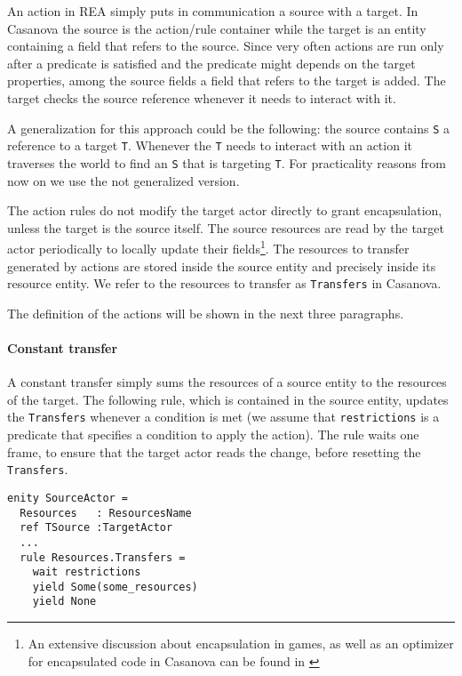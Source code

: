 An action in REA simply puts in communication a source with a target. In Casanova the source is the action/rule container while the target is an entity containing a field that refers to the source. Since very often actions are run only after a predicate is satisfied and the predicate might depends on the target properties, among the source fields a field that refers to the target is added. The target checks the source reference whenever it needs to interact with it. 

\noindent
A generalization for this approach could be the following: the source contains \texttt{S} a reference to a target \texttt{T}. Whenever the \texttt{T} needs to interact with an action it traverses the world to find an \texttt{S} that is targeting \texttt{T}. For practicality reasons from now on we use the not generalized version.


\noindent
The action rules do not modify the target actor directly to grant encapsulation, unless the target is the source itself. The source resources are read by the target actor periodically to locally update their fields\footnote{An extensive discussion about encapsulation in games, as well as an optimizer for encapsulated code in Casanova can be found in \cite{CASANOVA2_ENCAPSULATION}}. The resources to transfer generated by actions are stored inside the source entity and precisely inside its resource entity. We refer to the resources to transfer as \texttt{Transfers} in Casanova.

\noindent
The definition of the actions will be shown in the next three paragraphs.

\paragraph*{Constant transfer}
A constant transfer simply sums the resources of a source entity to the resources of the target. The following rule, which is contained in the source entity, updates the \texttt{Transfers} whenever a condition is met (we assume that \texttt{restrictions} is a predicate that specifies a condition to apply the action). The rule waits one frame, to ensure that the target actor reads the change, before resetting the \texttt{Transfers}.

\begin{lstlisting}[mathescape]
enity SourceActor =
  Resources   : ResourcesName
  ref TSource :TargetActor
  ...
  rule Resources.Transfers = 
    wait restrictions
    yield Some(some_resources)
    yield None
\end{lstlisting}


